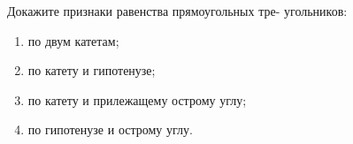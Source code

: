 Докажите признаки равенства прямоугольных тре-
угольников:
\begin{enumerate}[label=\asbuk*)]
	\item по двум катетам;
	\item по катету и гипотенузе;
	\item по катету и прилежащему острому углу;
	\item по гипотенузе и острому углу.
\end{enumerate}